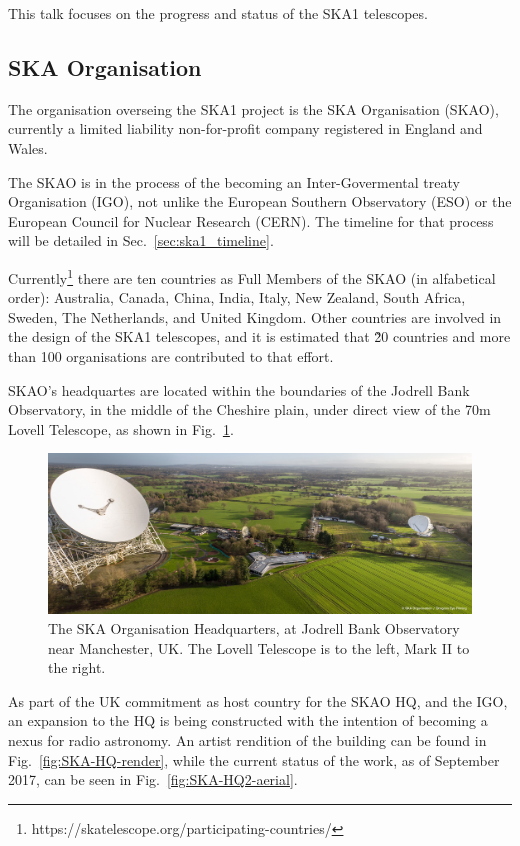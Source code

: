 \documentclass[a4paper,
               biblatex,       %
               keeplastbox,    %
               ]{jacow-2_1}    %
\begin{document}
This talk focuses on the progress and status of the SKA1 telescopes.

\subsection{SKA Organisation} %
\label{sub:ska_organisation}
The organisation overseing the SKA1 project is the SKA Organisation (SKAO), currently a limited liability non-for-profit company registered in England and Wales.

The SKAO is in the process of the becoming an Inter-Govermental treaty Organisation (IGO), not unlike the European Southern Observatory (ESO) or the European Council for Nuclear Research (CERN). The timeline for that process will be detailed in Sec.~\ref{sec:ska1_timeline}.

Currently\footnote{https://skatelescope.org/participating-countries/} there are ten countries as Full Members of the SKAO (in alfabetical order): Australia, Canada, China, India, Italy, New Zealand, South Africa, Sweden, The Netherlands, and United Kingdom. Other countries are involved in the design of the SKA1 telescopes, and it is estimated that \~20 countries and more than 100 organisations are contributed to that effort.

SKAO's headquartes are located within the boundaries of the Jodrell Bank Observatory, in the middle of the Cheshire plain, under direct view of the 70m Lovell Telescope, as shown in  Fig.~\ref{fig:SKA-HQ-at-Jodrell-Bank}.

\begin{figure}[!htb]
  \centering
    \includegraphics[width=\columnwidth]{SKA-HQ-aerial-panorama_web.jpg}
  \caption{The SKA Organisation Headquarters, at Jodrell Bank Observatory near Manchester, UK. The Lovell Telescope is to the left, Mark II to the right.}
  \label{fig:SKA-HQ-at-Jodrell-Bank}
\end{figure}

As part of the UK commitment as host country for the SKAO HQ, and the IGO, an expansion to the HQ is being constructed with the intention of becoming a nexus for radio astronomy. An artist rendition of the building can be found in Fig.~\ref{fig:SKA-HQ-render}, while the current status of the work, as of September 2017, can be seen in Fig.~\ref{fig:SKA-HQ2-aerial}.
\end{document}
